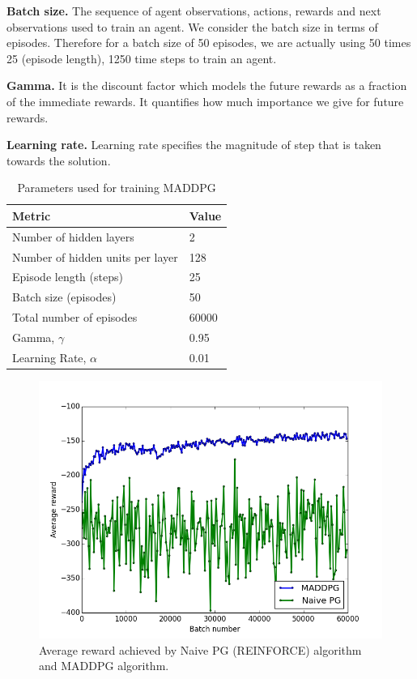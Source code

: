 \documentclass{article}
\begin{document}
\textbf{Batch size.} The sequence of agent observations, actions, rewards and next observations used to train an agent. We consider the batch size in terms of episodes. Therefore for a batch size of 50 episodes, we are actually using 50 times 25 (episode length), 1250 time steps to train an agent.

\textbf{Gamma.} It is the discount factor which models the future rewards as a fraction of the immediate rewards. It quantifies how much importance we give for future rewards.

\textbf{Learning rate.} Learning rate specifies the magnitude of step that is taken towards the solution. 

\begin{table}[h!]
  \begin{center}
    \caption{Parameters used for training MADDPG}
    \label{tab:basecase_parameters}
    \begin{tabular} {|l|l|} %
      \hline
      \textbf{Metric} & \textbf{Value} \\
      \hline
      Number of hidden layers & 2 \\
      Number of hidden units per layer & 128 \\
      Episode length (steps) & 25 \\
      Batch size (episodes) & 50 \\
      Total number of episodes & 60000 \\
      Gamma, $\gamma$ & 0.95 \\
      Learning Rate, $\alpha$ & 0.01 \\
      \hline
    \end{tabular}
  \end{center}
\end{table}

\begin{figure}
\begin{center}
\includegraphics[scale=0.4]{MADDPGvsPG}
\end{center}
\caption{Average reward achieved by Naive PG (REINFORCE) algorithm and MADDPG algorithm.}
\label{fig:MADDPGvsPG}
\end{figure}
\end{document}

